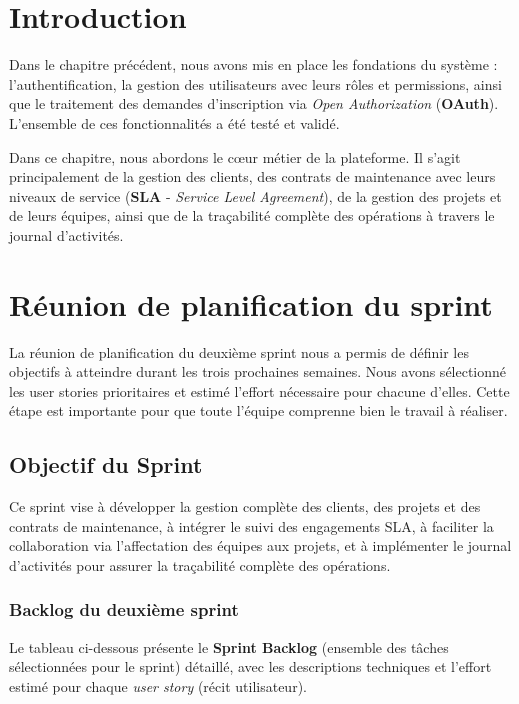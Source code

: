 ﻿\section*{Introduction}

Dans le chapitre précédent, nous avons mis en place les fondations du
système : l'authentification, la gestion des utilisateurs avec leurs rôles
et permissions, ainsi que le traitement des demandes d'inscription via
\textit{Open Authorization} (\textbf{OAuth}). L'ensemble de ces fonctionnalités a été testé et validé.

Dans ce chapitre, nous abordons le cœur métier de la plateforme. Il s'agit
principalement de la gestion des clients, des contrats de maintenance avec
leurs niveaux de service (\textbf{SLA} - \textit{Service Level Agreement}), de la gestion des projets et de leurs
équipes, ainsi que de la traçabilité complète des opérations à travers le
journal d'activités.
\section{Réunion de planification du sprint}
\label{sec:planning_sprint2}
La réunion de planification du deuxième sprint nous a permis de définir les objectifs à atteindre durant les trois prochaines semaines. Nous avons sélectionné les user stories prioritaires et estimé l'effort nécessaire pour chacune d'elles. Cette étape est importante pour que toute l'équipe comprenne bien le travail à réaliser.

\subsection{Objectif du Sprint}
Ce sprint vise à développer la gestion complète des clients, des projets et des contrats de maintenance, à intégrer le suivi des engagements SLA, à faciliter la collaboration via l'affectation des équipes aux projets, et à implémenter le journal d'activités pour assurer la traçabilité complète des opérations.


\subsubsection{Backlog du deuxième sprint}
\label{sec:backlog_sprint2}

Le tableau ci-dessous présente le \textbf{Sprint Backlog} (ensemble des tâches sélectionnées pour le sprint) détaillé, avec les descriptions techniques et l'effort estimé pour chaque \textit{user story} (récit utilisateur).

